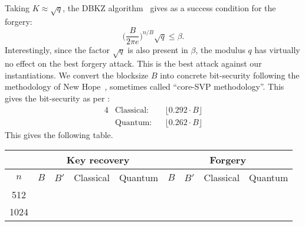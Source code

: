 Taking $K\approx \sqrt{q}$, the DBKZ algorithm~\cite[Corollary 2]{EC:MicWal16} gives as a success condition for
the forgery: %
\begin{equation}\label{eq:blocksize_forgery}
\bigg(\frac{B}{2\pi e}\bigg)^{n/B} \sqrt{q} \leq \beta.
\end{equation}
Interestingly, since the factor $\sqrt{q}$ is also present in $\beta$, the modulus $q$ has virtually no effect on the best forgery attack. This is the best attack against our instantiations.
We convert the blocksize $B$ into concrete bit-security following the methodology of
New Hope~\cite{USENIX:ADPS16}, sometimes called ``core-SVP methodology''.
This gives the  bit-security as per \cite{SODA:BDGL16,Laarhoven16}:
\begin{alignat}{4}
	&\text{Classical:} && \lfloor 0.292 \cdot B \rfloor \label{eq:sec_classic} \\
	&\text{Quantum:} && \lfloor 0.262 \cdot B \rfloor \label{eq:sec_quantum}
\end{alignat}
This gives the following table.
%


\begin{center}
	\begin{tabular}{||c|cc| c c|cc| c c||}
		\hline
		& \multicolumn{4}{c|}{Key recovery} & \multicolumn{4}{c||}{Forgery} \\
		\hline
		$n$ & $B$ & $B'$ & Classical & Quantum & $B$ & $B'$ & Classical & Quantum \\
		\hline
		512 & \keyrecbkzi & \keyrecsievei & \keyrecclassici & \keyrecquantumi & \forgebkzi & \forgesievei & \forgeclassici & \forgequantumi \\
		1024 & \keyrecbkzv & \keyrecsievev & \keyrecclassicv & \keyrecquantumv & \forgebkzv & \forgesievev & \forgeclassicv & \forgequantumv \\
		\hline
	\end{tabular}
\end{center}

